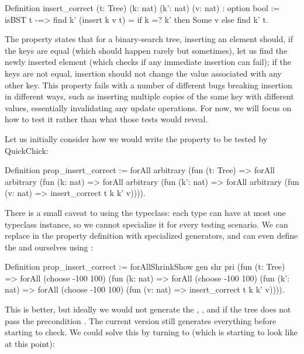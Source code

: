 \begin{code}[language=Rocq]
Definition insert_correct (t: Tree) (k: nat) (k': nat) (v: nat) : option bool :=
    isBST t -=>
      find k' (insert k v t) = if k =? k' then Some v else find k' t.
\end{code}

The property  states that for a binary-search tree, inserting an
element should, if the keys are equal (which should happen rarely but sometimes), let
us find the newly inserted element (which checks if any immediate insertion can fail);
if the keys are not equal, insertion should not change the value associated with any
other key. This property fails with a number of different bugs breaking insertion in
different ways, such as inserting multiple copies of the same key with different
values, essentially invalidating any update operations. For now, we will focus on how
to test it rather than what those tests would reveal.

Let us initially consider how we would write the property to be tested by QuickChick:

\begin{code}[language=Rocq]
Definition prop_insert_correct :=
  forAll arbitrary (fun (t: Tree) =>
  forAll arbitrary (fun (k: nat)  =>
  forAll arbitrary (fun (k': nat) =>
  forAll arbitrary (fun (v: nat)  =>
  insert_correct t k k' v)))).
\end{code}

There is a small caveat to using the  typeclass: each type can have at
most one typeclass instance, so we cannot specialize it for every testing scenario. We
can replace  in the property definition with specialized generators,
and can even define the  and  ourselves using
:

\begin{code}[language=Rocq]
Definition prop_insert_correct :=
  forAllShrinkShow gen shr pri (fun (t: Tree) =>
  forAll (choose -100 100)     (fun (k: nat)  =>
  forAll (choose -100 100)     (fun (k': nat) =>
  forAll (choose -100 100)     (fun (v: nat)  =>
  insert_correct t k k' v)))).
\end{code}

This is better, but ideally we would not generate the , , and 
if the tree  does not pass the precondition . The current version
still generates everything before starting to check. We could solve this by turning to
 (which is starting to look like
 at this point):

